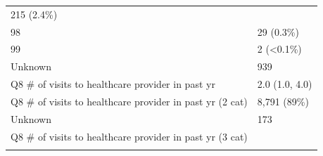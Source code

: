 \documentclass[]{article}
\begin{document}
\begin{longtable}[]{@{}ll@{}}
\begin{minipage}[t]{0.23\columnwidth}
215 (2.4\%)\strut
\end{minipage}\tabularnewline
\begin{minipage}[t]{0.71\columnwidth}\raggedright
98\strut
\end{minipage} & \begin{minipage}[t]{0.23\columnwidth}\raggedright
29 (0.3\%)\strut
\end{minipage}\tabularnewline
\begin{minipage}[t]{0.71\columnwidth}\raggedright
99\strut
\end{minipage} & \begin{minipage}[t]{0.23\columnwidth}\raggedright
2 (\textless{}0.1\%)\strut
\end{minipage}\tabularnewline
\begin{minipage}[t]{0.71\columnwidth}\raggedright
Unknown\strut
\end{minipage} & \begin{minipage}[t]{0.23\columnwidth}\raggedright
939\strut
\end{minipage}\tabularnewline
\begin{minipage}[t]{0.71\columnwidth}\raggedright
Q8 \# of visits to healthcare provider in past yr\strut
\end{minipage} & \begin{minipage}[t]{0.23\columnwidth}\raggedright
2.0 (1.0, 4.0)\strut
\end{minipage}\tabularnewline
\begin{minipage}[t]{0.71\columnwidth}\raggedright
Q8 \# of visits to healthcare provider in past yr (2 cat)\strut
\end{minipage} & \begin{minipage}[t]{0.23\columnwidth}\raggedright
8,791 (89\%)\strut
\end{minipage}\tabularnewline
\begin{minipage}[t]{0.71\columnwidth}\raggedright
Unknown\strut
\end{minipage} & \begin{minipage}[t]{0.23\columnwidth}\raggedright
173\strut
\end{minipage}\tabularnewline
\begin{minipage}[t]{0.71\columnwidth}\raggedright
Q8 \# of visits to healthcare provider in past yr (3 cat)\strut
\end{minipage} & \begin{minipage}[t]{0.23\columnwidth}\raggedright
\strut
\end{minipage}\tabularnewline
\begin{minipage}[t]{0.71\columnwidth}\raggedright

\end{minipage}
\end{longtable}
\end{document}
